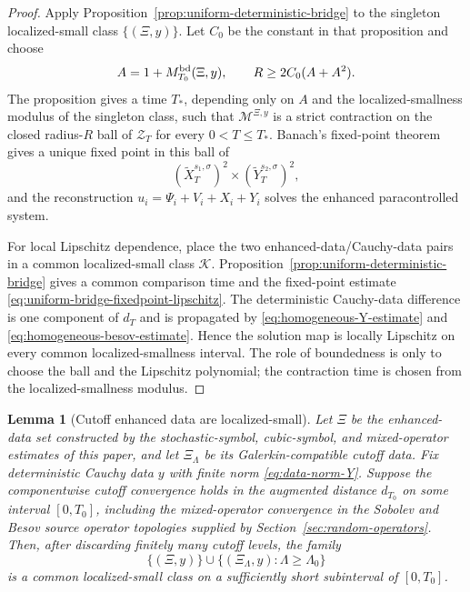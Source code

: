 \documentclass[10pt]{amsart}
\numberwithin{equation}{section}
\theoremstyle{plain}
\newtheorem{lemma}[theorem]{Lemma}
\theoremstyle{definition}
\theoremstyle{remark}
\newcommand{\calZ}{\mathcal{Z}}
\begin{document}
\begin{proof}
Apply Proposition~\ref{prop:uniform-deterministic-bridge} to the singleton localized-small class $\{(\Xi,y)\}$.  Let $C_0$ be the constant in that proposition and choose
\[
        A=1+M_{T_0}^{\rm bd}(\Xi,y),
        \qquad
        R\ge 2C_0(A+A^2).
\]
The proposition gives a time $T_*$, depending only on $A$ and the localized-smallness modulus of the singleton class, such that $\mathcal M^{\Xi,y}$ is a strict contraction on the closed radius-$R$ ball of $\calZ_T$ for every $0<T\le T_*$.  Banach's fixed-point theorem gives a unique fixed point in this ball of
\[
        (\widetilde X_T^{s_1,\sigma})^2\times(\widetilde Y_T^{s_2,\sigma})^2,
\]
and the reconstruction $u_i=\Psi_i+V_i+X_i+Y_i$ solves the enhanced paracontrolled system.

For local Lipschitz dependence, place the two enhanced-data/Cauchy-data pairs in a common localized-small class $\mathcal K$.  Proposition~\ref{prop:uniform-deterministic-bridge} gives a common comparison time and the fixed-point estimate \eqref{eq:uniform-bridge-fixedpoint-lipschitz}.  The deterministic Cauchy-data difference is one component of $d_T$ and is propagated by \eqref{eq:homogeneous-Y-estimate} and \eqref{eq:homogeneous-besov-estimate}.  Hence the solution map is locally Lipschitz on every common localized-smallness interval.  The role of boundedness is only to choose the ball and the Lipschitz polynomial; the contraction time is chosen from the localized-smallness modulus.
\end{proof}


\begin{lemma}[Cutoff enhanced data are localized-small]\label{lem:cutoff-localized-small}
Let $\Xi$ be the enhanced-data set constructed by the stochastic-symbol, cubic-symbol, and mixed-operator estimates of this paper, and let $\Xi_\Lambda$ be its Galerkin-compatible cutoff data.  Fix deterministic Cauchy data $y$ with finite norm \eqref{eq:data-norm-Y}.  Suppose the componentwise cutoff convergence holds in the augmented distance $d_{T_0}$ on some interval $[0,T_0]$, including the mixed-operator convergence in the Sobolev and Besov source operator topologies supplied by Section~\ref{sec:random-operators}.  Then, after discarding finitely many cutoff levels, the family
\[
        \{(\Xi,y)\}\cup\{(\Xi_\Lambda,y):\Lambda\ge\Lambda_0\}
\]
is a common localized-small class on a sufficiently short subinterval of $[0,T_0]$.
\end{lemma}
\end{document}
